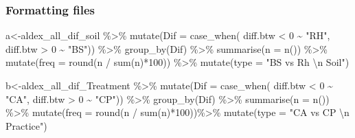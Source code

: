 \documentclass[]{interact}
\theoremstyle{plain}%
\theoremstyle{definition}
\theoremstyle{remark}
\newenvironment{Shaded}{\begin{snugshade}}{\end{snugshade}}
\newcommand{\AttributeTok}[1]{\textcolor[rgb]{0.77,0.63,0.00}{#1}}
\newcommand{\DecValTok}[1]{\textcolor[rgb]{0.00,0.00,0.81}{#1}}
\newcommand{\FunctionTok}[1]{\textcolor[rgb]{0.00,0.00,0.00}{#1}}
\newcommand{\NormalTok}[1]{#1}
\newcommand{\OtherTok}[1]{\textcolor[rgb]{0.56,0.35,0.01}{#1}}
\newcommand{\SpecialCharTok}[1]{\textcolor[rgb]{0.00,0.00,0.00}{#1}}
\newcommand{\StringTok}[1]{\textcolor[rgb]{0.31,0.60,0.02}{#1}}
\begin{document}
\hypertarget{formatting-files}{%
\subsubsection{Formatting files}\label{formatting-files}}

\begin{Shaded}
\begin{Highlighting}[]
\NormalTok{a}\OtherTok{\textless{}{-}}\NormalTok{aldex\_all\_dif\_soil }\SpecialCharTok{\%\textgreater{}\%}  \FunctionTok{mutate}\NormalTok{(}\AttributeTok{Dif =} \FunctionTok{case\_when}\NormalTok{(}
\NormalTok{  diff.btw }\SpecialCharTok{\textless{}} \DecValTok{0} \SpecialCharTok{\textasciitilde{}} \StringTok{"RH"}\NormalTok{,}
\NormalTok{  diff.btw }\SpecialCharTok{\textgreater{}} \DecValTok{0}  \SpecialCharTok{\textasciitilde{}} \StringTok{"BS"}\NormalTok{)) }\SpecialCharTok{\%\textgreater{}\%} \FunctionTok{group\_by}\NormalTok{(Dif) }\SpecialCharTok{\%\textgreater{}\%}
  \FunctionTok{summarise}\NormalTok{(}\AttributeTok{n =} \FunctionTok{n}\NormalTok{()) }\SpecialCharTok{\%\textgreater{}\%} 
  \FunctionTok{mutate}\NormalTok{(}\AttributeTok{freq =} \FunctionTok{round}\NormalTok{(n }\SpecialCharTok{/} \FunctionTok{sum}\NormalTok{(n)}\SpecialCharTok{*}\DecValTok{100}\NormalTok{)) }\SpecialCharTok{\%\textgreater{}\%} \FunctionTok{mutate}\NormalTok{(}\AttributeTok{type =} \StringTok{"BS vs Rh }\SpecialCharTok{\textbackslash{}n}\StringTok{  Soil"}\NormalTok{)}

\NormalTok{b}\OtherTok{\textless{}{-}}\NormalTok{aldex\_all\_dif\_Treatment }\SpecialCharTok{\%\textgreater{}\%}  \FunctionTok{mutate}\NormalTok{(}\AttributeTok{Dif =} \FunctionTok{case\_when}\NormalTok{(}
\NormalTok{  diff.btw }\SpecialCharTok{\textless{}} \DecValTok{0} \SpecialCharTok{\textasciitilde{}} \StringTok{"CA"}\NormalTok{,}
\NormalTok{  diff.btw }\SpecialCharTok{\textgreater{}} \DecValTok{0}  \SpecialCharTok{\textasciitilde{}} \StringTok{"CP"}\NormalTok{)) }\SpecialCharTok{\%\textgreater{}\%} \FunctionTok{group\_by}\NormalTok{(Dif) }\SpecialCharTok{\%\textgreater{}\%}
  \FunctionTok{summarise}\NormalTok{(}\AttributeTok{n =} \FunctionTok{n}\NormalTok{()) }\SpecialCharTok{\%\textgreater{}\%}
  \FunctionTok{mutate}\NormalTok{(}\AttributeTok{freq =} \FunctionTok{round}\NormalTok{(n }\SpecialCharTok{/} \FunctionTok{sum}\NormalTok{(n)}\SpecialCharTok{*}\DecValTok{100}\NormalTok{))}\SpecialCharTok{\%\textgreater{}\%} \FunctionTok{mutate}\NormalTok{(}\AttributeTok{type =} \StringTok{"CA vs CP }\SpecialCharTok{\textbackslash{}n}\StringTok{ Practice"}\NormalTok{)}


\end{Highlighting}
\end{Shaded}
\end{document}
